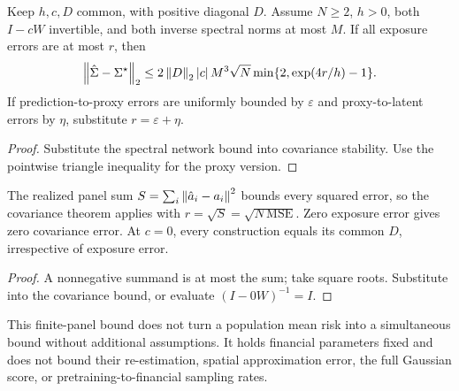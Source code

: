 \begin{theorem}\label{thm:pipeline-covariance}
  \leanok
  Keep $h,c,D$ common, with positive diagonal $D$. Assume $N\ge2$, $h>0$,
  both $I-cW$ invertible, and both inverse spectral norms at most $M$.
  If all exposure errors are at most $r$, then
  \[
    \left\lVert\hat\Sigma-\Sigma^\star\right\rVert_2
    \le2\left\lVert D\right\rVert_2\left\lvert c\right\rvert M^3\sqrt N\min\{2,\exp(4r/h)-1\}.
  \]
  If prediction-to-proxy errors are uniformly bounded by $\varepsilon$ and
  proxy-to-latent errors by $\eta$, substitute $r=\varepsilon+\eta$.
\end{theorem}
\begin{proof}\leanok
  Substitute the spectral network bound into covariance stability. Use the
  pointwise triangle inequality for the proxy version.
\end{proof}

\begin{corollary}\label{thm:pipeline-panel}
  \leanok
  The realized panel sum $S=\sum_i\left\lVert\hat a_i-a_i\right\rVert^2$ bounds every squared
  error, so the covariance theorem applies with $r=\sqrt
  S=\sqrt{N\,\mathrm{MSE}}$.
  Zero exposure error gives zero covariance error. At $c=0$, every construction
  equals its common $D$, irrespective of exposure error.
\end{corollary}
\begin{proof}\leanok
  A nonnegative summand is at most the sum; take square roots. Substitute into
  the covariance bound, or evaluate $(I-0W)^{-1}=I$.
\end{proof}

This finite-panel bound does not turn a population mean risk into a simultaneous
bound without additional assumptions. It holds financial parameters fixed and
does not bound their re-estimation, spatial approximation error, the
full Gaussian
score, or pretraining-to-financial sampling rates.
